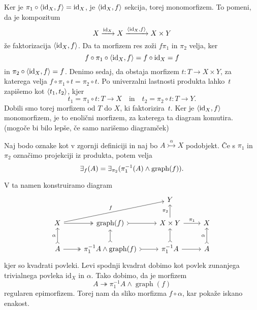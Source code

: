\documentclass[../kategoricna_logika.tex]{subfiles}
\begin{document}
\begin{dokaz}
  Ker je $\pi_1 \circ \langle \mathrm{id}_X, f \rangle = \mathrm{id}_X$, je
  $\langle \mathrm{id}_X, f \rangle$ sekcija, torej monomorfizem. To pomeni,
  da je kompozitum
  \[X \xrightarrow{\mathrm{id}_X} X
    \xrightarrow{\langle \mathrm{id}_X,f \rangle} X \times Y\] že
  faktorizacija $\langle \mathrm{id}_X, f \rangle$. Da ta morfizem res zoži
  $f \pi_1$ in $\pi_2$ velja, ker
  \[ f \circ \pi_1 \circ \langle \mathrm{id}_X, f \rangle = f \circ
    \mathrm{id}_X = f\] in $\pi_2 \circ \langle \mathrm{id}_X, f \rangle = f$.
  Denimo sedaj, da obstaja morfizem $t : T \to X \times Y$, za
  katerega velja $f \circ \pi_1 \circ t = \pi_2 \circ t$. Po
  univerzalni lastnosti produkta lahko~$t$ zapišemo kot
  $\langle t_1, t_2 \rangle$, kjer
  \[t_1 = \pi_1 \circ t : T \to X \quad \text{in} \quad t_2 = \pi_2
    \circ t : T \to Y. \] Dobili smo torej morfizem od $T$ do $X$, ki
  faktorizira~$t$. Ker je $\langle \mathrm{id}_X, f \rangle$ monomorfizem, je
  to enolični morfizem, za katerega ta diagram komutira. (mogoče bi
  bilo lepše, če samo narišemo diagramček)
\end{dokaz}
\begin{lema}
  Naj bodo oznake kot v zgornji definiciji in naj bo
  $A \overset{\alpha}{\rightarrowtail} X$ podobjekt. Če s $\pi_1$ in
  $\pi_2$ označimo projekciji iz produkta, potem velja
  $$\exists_f(A) = \exists_{\pi_2}(\pi_1^{-1}(A) \wedge \operatorname{graph}(f)).$$
\end{lema}
\begin{dokaz}
  V ta namen konstruiramo diagram
  \begin{equation*}
    \begin{tikzcd}
      & & Y & \\
      X \ar[urr, "f"] \ar[r, two heads] & \operatorname{graph}(f)
      \ar[r, tail] &
      X \times Y \ar[u, "\pi_2"] \ar[r, "\pi_1"] & X \\
      A \ar[u, tail, "\alpha"] \ar[r, two heads] & \pi_1^{-1}A \land
      \operatorname{graph}(f) \ar[u, tail] \ar[r, tail] & \pi_1^{-1}A
      \ar[u, tail] \ar[r] & A \ar[u, tail, "\alpha"]
    \end{tikzcd}
  \end{equation*}
  kjer so kvadrati povleki.  Levi spodnji kvadrat dobimo kot povlek
  zunanjega trivialnega povleka $\mathrm{id}_X$ in $\alpha$.  Tako
  dobimo, da je morfizem
  $$A \twoheadrightarrow \pi_1^{-1}A \land \operatorname{graph}(f)$$
  regularen epimorfizem.  Torej nam da sliko morfizma
  $f \circ \alpha$, kar pokaže iskano enakost.
\end{dokaz}
\end{document}
